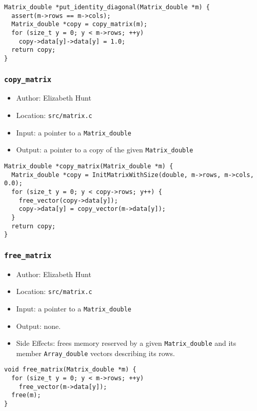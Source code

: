 \documentclass[11pt]{article}
\begin{document}
\begin{verbatim}
Matrix_double *put_identity_diagonal(Matrix_double *m) {
  assert(m->rows == m->cols);
  Matrix_double *copy = copy_matrix(m);
  for (size_t y = 0; y < m->rows; ++y)
    copy->data[y]->data[y] = 1.0;
  return copy;
}
\end{verbatim}

\subsubsection{\texttt{copy\_matrix}}
\label{sec:orge750c56}
\begin{itemize}
\item Author: Elizabeth Hunt
\item Location: \texttt{src/matrix.c}
\item Input: a pointer to a \texttt{Matrix\_double}
\item Output: a pointer to a copy of the given \texttt{Matrix\_double}
\end{itemize}

\begin{verbatim}
Matrix_double *copy_matrix(Matrix_double *m) {
  Matrix_double *copy = InitMatrixWithSize(double, m->rows, m->cols, 0.0);
  for (size_t y = 0; y < copy->rows; y++) {
    free_vector(copy->data[y]);
    copy->data[y] = copy_vector(m->data[y]);
  }
  return copy;
}
\end{verbatim}

\subsubsection{\texttt{free\_matrix}}
\label{sec:org4ebcf85}
\begin{itemize}
\item Author: Elizabeth Hunt
\item Location: \texttt{src/matrix.c}
\item Input: a pointer to a \texttt{Matrix\_double}
\item Output: none.
\item Side Effects: frees memory reserved by a given \texttt{Matrix\_double} and its member
\texttt{Array\_double} vectors describing its rows.
\end{itemize}

\begin{verbatim}
void free_matrix(Matrix_double *m) {
  for (size_t y = 0; y < m->rows; ++y)
    free_vector(m->data[y]);
  free(m);
}
\end{verbatim}
\end{document}
